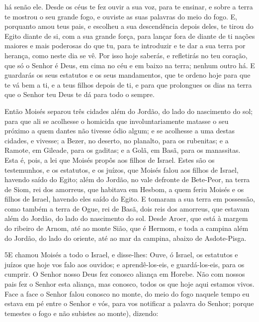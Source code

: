 há senão ele. Desde os céus te fez ouvir a sua voz, para te
ensinar, e sobre a terra te mostrou o seu grande fogo, e ouviste as
suas palavras do meio do fogo. E, porquanto amou teus pais, e
escolheu a sua descendência depois deles, te tirou do Egito diante
de si, com a sua grande força, para lançar fora de diante de
ti nações maiores e mais poderosas do que tu, para te introduzir e
te dar a sua terra por herança, como neste dia se vê. Por
isso hoje saberás, e refletirás no teu coração, que só o Senhor é
Deus, em cima no céu e em baixo na terra; nenhum outro há. E
guardarás os seus estatutos e os seus mandamentos, que te ordeno
hoje para que te vá bem a ti, e a teus filhos depois de ti, e para
que prolongues os dias na terra que o Senhor teu Deus te dá para
todo o sempre.

Então Moisés separou três cidades além do Jordão, do lado do
nascimento do sol; para que ali se acolhesse o homicida que
involuntariamente matasse o seu próximo a quem dantes não tivesse
ódio algum; e se acolhesse a uma destas cidades, e vivesse; a
Bezer, no deserto, no planalto, para os rubenitas; e a Ramote, em
Gileade, para os gaditas; e a Golã, em Basã, para os manassitas.
Esta é, pois, a lei que Moisés propôs aos filhos de Israel.
Estes são os testemunhos, e os estatutos, e os juízos, que
Moisés falou aos filhos de Israel, havendo saído do Egito;
além do Jordão, no vale defronte de Bete-Peor, na terra de
Siom, rei dos amorreus, que habitava em Hesbom, a quem feriu Moisés
e os filhos de Israel, havendo eles saído do Egito. E tomaram
a sua terra em possessão, como também a terra de Ogue, rei de Basã,
dois reis dos amorreus, que estavam além do Jordão, do lado do
nascimento do sol. Desde Aroer, que está à margem do ribeiro
de Arnom, até ao monte Sião, que é Hermom, e toda a campina
além do Jordão, do lado do oriente, até ao mar da campina, abaixo de
Asdote-Pisga.

\medskip

\lettrine{5} E chamou Moisés a todo o Israel, e disse-lhes:
Ouve, ó Israel, os estatutos e juízos que hoje vos falo aos ouvidos;
e aprendê-los-eis, e guardá-los-eis, para os cumprir. O Senhor
nosso Deus fez conosco aliança em Horebe. Não com nossos pais
fez o Senhor esta aliança, mas conosco, todos os que hoje aqui
estamos vivos. Face a face o Senhor falou conosco no monte, do
meio do fogo naquele tempo eu estava em pé entre o Senhor e vós,
para vos notificar a palavra do Senhor; porque temestes o fogo e não
subistes ao monte), dizendo:

